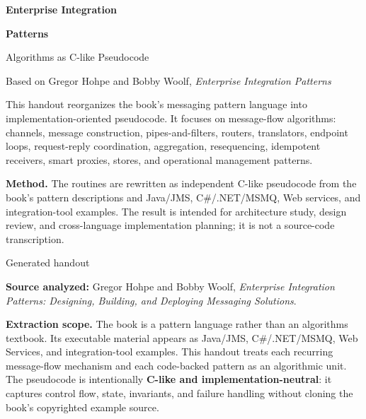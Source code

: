 \documentclass[11pt]{article}
\begin{document}
\hypersetup{pageanchor=false}

\begin{titlepage}
  \centering
  \vspace*{1.4cm}
  {\Huge\bfseries\color{EIPBlue}Enterprise Integration\par}
  \vspace{0.15cm}
  {\Huge\bfseries\color{EIPBlue}Patterns\par}
  \vspace{0.35cm}
  {\LARGE Algorithms as C-like Pseudocode\par}
  \vspace{0.25cm}
  {\large Based on Gregor Hohpe and Bobby Woolf, \textit{Enterprise Integration Patterns}\par}
  \vspace{0.9cm}
  \begin{scopebox}
  This handout reorganizes the book's messaging pattern language into implementation-oriented pseudocode. It focuses on message-flow algorithms: channels, message construction, pipes-and-filters, routers, translators, endpoint loops, request-reply coordination, aggregation, resequencing, idempotent receivers, smart proxies, stores, and operational management patterns.
  \end{scopebox}
  \vspace{0.7cm}
  \begin{methodbox}
  \textbf{Method.} The routines are rewritten as independent C-like pseudocode from the book's pattern descriptions and Java/JMS, C\#/.NET/MSMQ, Web services, and integration-tool examples. The result is intended for architecture study, design review, and cross-language implementation planning; it is not a source-code transcription.
  \end{methodbox}
  \vfill
  {\large Generated handout\par}
\end{titlepage}

\clearpage
\tableofcontents
\clearpage
\hypersetup{pageanchor=true}

\textbf{Source analyzed:} Gregor Hohpe and Bobby Woolf, \emph{Enterprise
Integration Patterns: Designing, Building, and Deploying Messaging
Solutions}.

\textbf{Extraction scope.} The book is a pattern language rather than an
algorithms textbook. Its executable material appears as Java/JMS,
C\#/.NET/MSMQ, Web Services, and integration-tool examples. This handout
treats each recurring message-flow mechanism and each code-backed
pattern as an algorithmic unit. The pseudocode is intentionally
\textbf{C-like and implementation-neutral}: it captures control flow,
state, invariants, and failure handling without cloning the book's
copyrighted example source.
\end{document}
